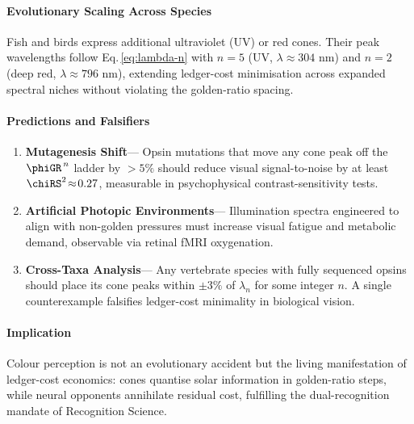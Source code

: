 \documentclass[11pt,oneside]{book}
\begin{document}
{\paragraph{Evolutionary Scaling Across Species}

Fish and birds express additional ultraviolet (UV) or red cones.
Their peak wavelengths follow Eq.\,\ref{eq:lambda-n} with
$n=5$ (UV, $\lambda\!\approx\!304$ nm) and
$n=2$ (deep red, $\lambda\!\approx\!796$ nm),
extending ledger-cost minimisation across expanded spectral niches
without violating the golden-ratio spacing.

\paragraph{Predictions and Falsifiers}

\begin{enumerate}\setlength\itemsep{4pt}
\item \textbf{Mutagenesis Shift}\;—\;
      Opsin mutations that move any cone peak off the
      $\phiGR^{\,n}$ ladder by $>5\%$ should reduce visual
      signal-to-noise by at least
      $\chiRS^{2}\!\approx\!0.27$, measurable in psychophysical
      contrast-sensitivity tests.
\item \textbf{Artificial Photopic Environments}\;—\;
      Illumination spectra engineered to align with non-golden
      pressures must increase visual fatigue and metabolic demand,
      observable via retinal fMRI oxygenation.
\item \textbf{Cross-Taxa Analysis}\;—\;
      Any vertebrate species with fully sequenced opsins should place
      its cone peaks within $\pm3\%$ of $\lambda_{n}$ for some integer
      $n$.  A single counterexample falsifies ledger-cost
      minimality in biological vision.
\end{enumerate}

\paragraph*{Implication}

Colour perception is not an evolutionary accident but the living
manifestation of ledger-cost economics:
cones quantise solar information in golden-ratio steps,
while neural opponents annihilate residual cost,
fulfilling the dual-recognition mandate of Recognition Science.

}
\end{document}
